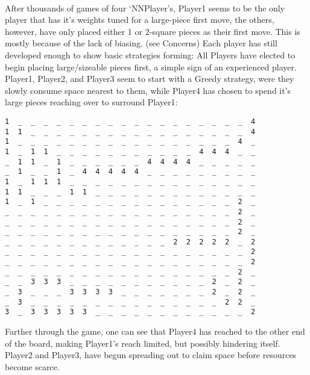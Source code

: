 \documentclass{report}
\begin{document}
{{	\\
		After thousands of games of four `NNPlayer's, Player1 seems to be the only player that has it's weights tuned for a large-piece first move, the others, however, have only placed either
		1 or 2-square pieces as their first move. This is mostly because of the lack of biasing. (see Concerns) Each player has still developed enough to show basic strategies forming: All
		Players have elected to begin placing large/sizeable pieces first, a simple sign of an experienced player. Player1, Player2, and Player3 seem to start with a Greedy strategy, were they
		slowly consume space nearest to them, while Player4 has chosen to spend it's large pieces reaching over to surround Player1:
		\break
		\break
		\break
		\break
		\break
		\break
		\break
		\break
		\break
		\break
		\break
		\break
		\break
		\lstset{basicstyle=\footnotesize}
		\begin{lstlisting}
1  _  _  _  _  _  _  _  _  _  _  _  _  _  _  _  _  _  _  4
1  1  _  _  _  _  _  _  _  _  _  _  _  _  _  _  _  _  _  4
1  _  _  _  _  _  _  _  _  _  _  _  _  _  _  _  _  _  4  _
1  _  1  1  _  _  _  _  _  _  _  _  _  _  _  4  4  4  _  _
_  1  1  _  1  _  _  _  _  _  _  4  4  4  4  _  _  _  _  _
_  1  _  _  1  _  4  4  4  4  4  _  _  _  _  _  _  _  _  _
1  _  1  1  1  _  _  _  _  _  _  _  _  _  _  _  _  _  _  _
1  1  _  _  _  1  1  _  _  _  _  _  _  _  _  _  _  _  _  _
1  _  1  _  _  _  _  _  _  _  _  _  _  _  _  _  _  _  2  _
_  _  _  _  _  _  _  _  _  _  _  _  _  _  _  _  _  _  2  _
_  _  _  _  _  _  _  _  _  _  _  _  _  _  _  _  _  _  2  _
_  _  _  _  _  _  _  _  _  _  _  _  _  _  _  _  _  _  2  _
_  _  _  _  _  _  _  _  _  _  _  _  _  2  2  2  2  2  _  2
_  _  _  _  _  _  _  _  _  _  _  _  _  _  _  _  _  _  _  2
_  _  _  _  _  _  _  _  _  _  _  _  _  _  _  _  _  _  _  2
_  _  _  _  _  _  _  _  _  _  _  _  _  _  _  _  _  _  2  _
_  _  3  3  3  _  _  _  _  _  _  _  _  _  _  _  2  _  2  _
_  3  _  _  _  3  3  3  3  _  _  _  _  _  _  _  2  _  2  _
_  3  _  _  _  _  _  _  _  _  _  _  _  _  _  _  _  2  2  _
3  _  3  3  3  3  3  _  _  _  _  _  _  _  _  _  _  _  _  2
		\end{lstlisting}\hfill\break
		\break\break\break\break\break
		Farther through the game, one can see that Player4 has reached to the other end of the board, making Player1's reach limited, but possibly hindering itself. Player2 and Player3, have 
		begun spreading out to claim space before resources become scarce.
		\lstset{basicstyle=\footnotesize}
		\begin{lstlisting}

\end{lstlisting}}}
\end{document}
